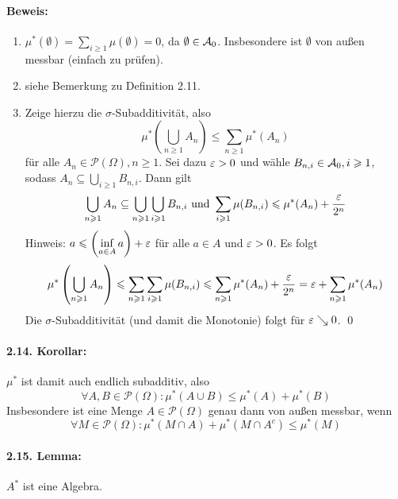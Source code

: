 \documentclass[12pt]{report}
\begin{document}
\paragraph{Beweis:}
\begin{enumerate}[label=(\roman*)]
    \item $\mu^*(\emptyset)=\sum_{i\geq1}\mu(\emptyset)=0$, da $\emptyset\in\mathcal{A}_0$. Insbesondere ist $\emptyset$ von au\ss{}en messbar (einfach zu pr\"ufen).
    \item siehe Bemerkung zu Definition 2.11. 
    \item Zeige hierzu die $\sigma$-Subadditivit\"at, also 
    $$\mu^*\left(\bigcup_{n\geq1}A_n\right)\leq\sum_{n\geq1}\mu^*(A_n)$$
    f\"ur alle $A_n\in\mathcal{P}(\Omega),n\ge1$. Sei dazu $\varepsilon>0$ und w\"ahle $B_{n,i}\in\mathcal{A}_0,i\geqslant1$, sodass $A_n\subseteq\bigcup_{i\geq1}B_{n,i}$. Dann gilt 
    $$\bigcup_{n\geqslant1}A_n\subseteq\bigcup_{n\geqslant1}\bigcup_{i\geqslant1}B_{n,i}\text{ und }\sum_{i\geqslant1}\mu(B_{n,i})\leqslant\mu^*(A_n)+\dfrac{\varepsilon}{2^n}$$
Hinweis: $a\leqslant\left(\displaystyle\inf_{a\in A}a\right)+\varepsilon$ f\"ur alle $a\in A$ und $\varepsilon>0$. Es folgt
$$\mu^*\left(\bigcup_{n\geqslant1}A_n\right)\leqslant\sum_{n\geqslant1}\sum_{i\geqslant1}\mu(B_{n,i})\leqslant\sum_{n\geqslant1}\mu^*(A_n)+\dfrac{\varepsilon}{2^n}=\varepsilon+\sum_{n\geqslant1}\mu^*(A_n)$$
Die $\sigma$-Subadditivit\"at (und damit die Monotonie) folgt f\"ur $\varepsilon\searrow0$. \qed
\end{enumerate}

\paragraph{2.14. Korollar:}$\mu^*$ ist damit auch endlich subadditiv, also
$$\forall A,B\in\mathcal{P}(\Omega):\mu^*(A\cup B)\leq\mu^*(A)+\mu^*(B)$$
Insbesondere ist eine Menge $A\in\mathcal{P}(\Omega)$ genau dann von au\ss{}en messbar, wenn
$$\forall M\in\mathcal{P}(\Omega):\mu^*(M\cap A)+ \mu^*(M\cap A^c)\leq\mu^*(M)$$

\paragraph{2.15. Lemma:}$A^*$ ist eine Algebra. 
\end{document}

